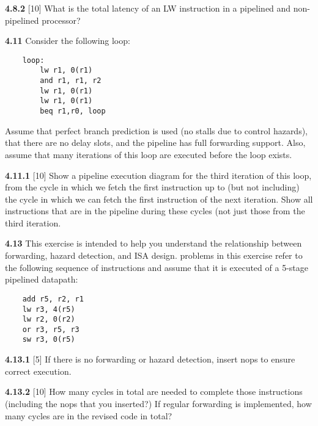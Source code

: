 \documentclass[fleqn]{article}
\begin{document}
\textbf{4.8.2} [10] \textrangle \; What is the total latency of an LW instruction in a pipelined and non-pipelined processor?
\vspace{0.125in}

\textbf{4.11} Consider the following loop:
\begin{lstlisting}
    loop:
        lw r1, 0(r1)
        and r1, r1, r2
        lw r1, 0(r1)
        lw r1, 0(r1)
        beq r1,r0, loop
\end{lstlisting}
Assume that perfect branch prediction is used (no stalls due to control hazards), that there are no delay slots,
and the pipeline has full forwarding support. Also, assume that many iterations of this loop are executed
before the loop exists.

\textbf{4.11.1} [10] \textrangle \; Show a pipeline execution diagram for the third iteration of this loop, from the cycle in which we
fetch the first instruction up to (but not including) the cycle in which we can fetch the first instruction of
the next iteration. Show all instructions that are in the pipeline during these cycles (not just those from the
third iteration.
\vspace{0.125in}

\textbf{4.13} This exercise is intended to help you understand the relationship between forwarding, hazard detection,
and ISA design. problems in this exercise refer to the following sequence of instructions and assume that it
is executed of a 5-stage pipelined datapath:
\begin{lstlisting}
    add r5, r2, r1
    lw r3, 4(r5)
    lw r2, 0(r2)
    or r3, r5, r3
    sw r3, 0(r5)
\end{lstlisting}


\textbf{4.13.1} [5] \textrangle \; If there is no forwarding or hazard detection, insert nops to ensure correct execution.

\textbf{4.13.2} [10] \textrangle \; How many cycles in total are needed to complete those instructions (including the nops that you
inserted?) If regular forwarding is implemented, how many cycles are in the revised code in total?
\vspace{0.125in}
\end{document}
